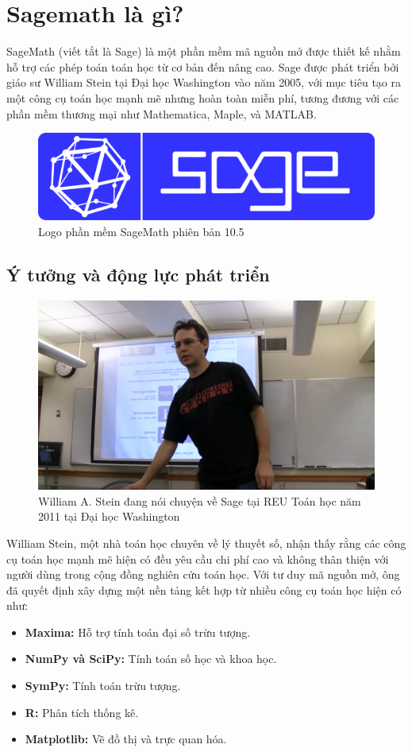 \section{Sagemath là gì?}

SageMath (viết tắt là Sage) là một phần mềm mã nguồn mở được thiết kế nhằm hỗ trợ các phép toán toán học từ cơ bản đến nâng cao. Sage được phát triển bởi giáo sư William Stein tại Đại học Washington vào năm 2005, với mục tiêu tạo ra một công cụ toán học mạnh mẽ nhưng hoàn toàn miễn phí, tương đương với các phần mềm thương mại như Mathematica, Maple, và MATLAB.

\begin{figure}[H]
	\centering
	\includegraphics[width=0.7\linewidth]{images/screenshot005}
	\caption{Logo phần mềm SageMath phiên bản 10.5}
	\label{fig:screenshot005}
\end{figure}

\subsection{Ý tưởng và động lực phát triển}

\begin{figure}
	\centering
	\includegraphics[width=0.7\linewidth]{images/screenshot006}
	\caption{William A. Stein đang nói chuyện về Sage tại REU Toán học năm 2011 tại Đại học Washington}
	\label{fig:screenshot006}
\end{figure}

William Stein, một nhà toán học chuyên về lý thuyết số, nhận thấy rằng các công cụ toán học mạnh mẽ hiện có đều yêu cầu chi phí cao và không thân thiện với người dùng trong cộng đồng nghiên cứu toán học. Với tư duy mã nguồn mở, ông đã quyết định xây dựng một nền tảng kết hợp từ nhiều công cụ toán học hiện có như:
\begin{itemize}
	\item \textbf{Maxima:} Hỗ trợ tính toán đại số trừu tượng.
	\item \textbf{NumPy và SciPy:} Tính toán số học và khoa học.
	\item \textbf{SymPy:} Tính toán trừu tượng.
	\item \textbf{R:} Phân tích thống kê.
	\item \textbf{Matplotlib:} Vẽ đồ thị và trực quan hóa.
\end{itemize}

